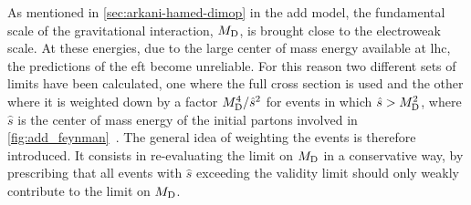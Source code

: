 As mentioned in \cref{sec:arkani-hamed-dimop} in the \gls{add} model, the
fundamental scale of the gravitational interaction, $M_\mathrm{D}$, is brought close to
the electroweak scale. At these energies, due to the large center of mass energy
available at \gls{lhc}, the predictions of the \gls{eft} become unreliable. For
this reason two different sets of limits have been calculated, one where the
full cross section is used and the other where it is weighted down by a factor
$M_\mathrm{D}^4/\hat{s}^2$ for events in which $\hat{s} > M_\mathrm{D}^2$, where $\hat{s}$ is the
center of mass energy of the initial partons involved in
\cref{fig:add_feynman}~\cite{LEDWeightFactor}. The general idea of weighting the
events is therefore introduced. It consists in re-evaluating the limit on $M_\mathrm{D}$
in a conservative way, by prescribing that all events with $\hat{s}$ exceeding
the validity limit should only weakly contribute to the limit on $M_\mathrm{D}$.

